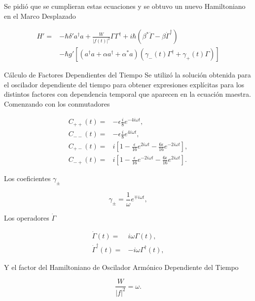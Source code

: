 \documentclass[11pt]{beamer}
\begin{document}
\begin{frame}
Se pidió que se cumplieran estas ecuaciones y se obtuvo un nuevo Hamiltoniano en el Marco Desplazado

\begin{align}
H'=& \nonumber -\hbar \delta' a^\dagger a + \frac{W}{|f(t)|^2}\Gamma \Gamma^\dagger + i\hbar(\beta^*\dot{\Gamma} - \beta \dot{\Gamma}^\dagger) \\
&-\hbar g'[(a^{\dagger}a +\alpha a^{\dagger}+\alpha^* a)(\gamma_-(t)\Gamma^{\dagger}+\gamma_+(t)\Gamma)]
\end{align}
\end{frame}

\begin{frame}{Cálculo de Factores Dependientes del Tiempo}
Se utilizó la solución obtenida para el oscilador dependiente del tiempo para obtener expresiones explícitas para los distintos factores con dependencia temporal que aparecen en la ecuación maestra. Comenzando con los conmutadores

\begin{align}
C_{++}(t) =& -\epsilon\frac{i}{8}e^{-4i\omega t},\\
C_{--}(t) =& -\epsilon\frac{i}{8}e^{4i\omega t},\\
C_{+-}(t) =& i [1 -\frac{\epsilon}{16}e^{2i\omega t}-\frac{6\epsilon}{16}e^{-2i\omega t}],\\
C_{-+}(t) =& i [1 -\frac{\epsilon}{16}e^{-2i\omega t}-\frac{6\epsilon}{16}e^{2i\omega t}].
\end{align}

\end{frame}

\begin{frame}
Los coeficientes $\gamma_\pm$

\begin{equation}
\gamma_\pm= \frac{1}{\omega}e^{\mp i\omega t},
\end{equation}

Los operadores $\dot{\Gamma}$

\begin{align}
\dot{\Gamma}(t) =& i\omega \Gamma(t),\\
\dot{\Gamma}^\dagger(t) =& -i\omega \Gamma^\dagger(t),
\end{align}

Y el factor del Hamiltoniano de Oscilador Armónico Dependiente del Tiempo

\begin{equation}
\frac{W}{|f|^2} = \omega.
\end{equation}

\end{frame}
\end{document}
